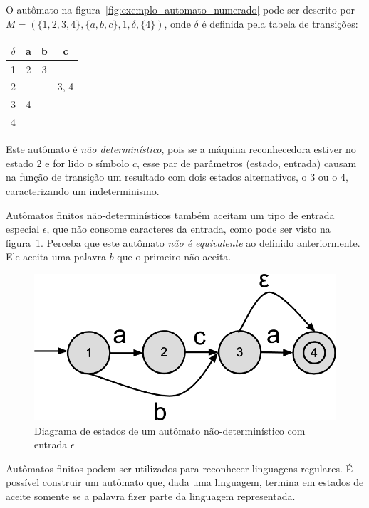\documentclass[a4paper,12pt,oneside,onecolumn]{uerj}
\begin{document}
O autômato na figura~\ref{fig:exemplo_automato_numerado} pode ser descrito por $M=(\{1,2,3,4\}, \{a,b,c\}, 1, \delta, \{4\})$, onde $\delta$ é definida pela tabela de transições:

\begin{center}
	\begin{tabular}{ c || c | c | c }
		{\bf $\delta$} & {\bf a} & {\bf b} & {\bf c} \\
		\hline 
		\hline 
		1 & 2 & 3 &  \\ 
		\hline 
		2 &   &   & 3, 4 \\ 
		\hline 
		3 & 4 &   &  \\ 
		\hline 
		4 &   &   &  \\ 
	\end{tabular}
\end{center}

Este autômato é \emph{não determinístico}, pois se a máquina reconhecedora estiver no  estado 2 e for lido o símbolo $c$, esse par de parâmetros (estado, entrada) causam na função de transição um resultado com dois estados alternativos, o 3 ou o 4, caracterizando um indeterminismo.

Autômatos finitos não-determinísticos também aceitam um tipo de entrada especial $\epsilon$, que não consome caracteres da entrada, como pode ser visto na figura~\ref{fig:exemplo_automato_epsilon}. Perceba que este autômato \emph{não é equivalente} ao definido anteriormente. Ele aceita uma palavra $b$ que o primeiro não aceita.

\begin{figure}[ht]
  \centering
  \includegraphics[scale=0.3]{figures/exemplo_automato_epsilon.png}
  \caption{Diagrama de estados de um autômato não-determinístico com entrada $\epsilon$}
  \label{fig:exemplo_automato_epsilon}
\end{figure}


Autômatos finitos podem ser utilizados para reconhecer linguagens regulares. É possível construir um autômato que, dada uma linguagem, termina em estados de aceite somente se a palavra fizer parte da linguagem representada.
\end{document}
